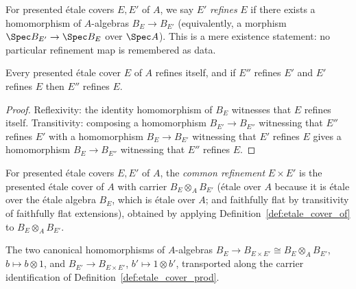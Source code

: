 \begin{definition}[Refinement]
  \label{def:etale_cover_refines}
  \leanok
  For presented \'etale covers \(E, E'\) of \(A\), we say \(E'\) \emph{refines} \(E\) if there
  exists a homomorphism of \(A\)-algebras \(B_E \to B_{E'}\) (equivalently, a morphism
  \(\Spec B_{E'} \to \Spec B_E\) over \(\Spec A\)). This is a mere existence statement: no
  particular refinement map is remembered as data.
\end{definition}

\begin{lemma}
  \label{lem:etale_cover_refines_preorder}
  \leanok
  Every presented \'etale cover \(E\) of \(A\) refines itself, and if \(E''\) refines \(E'\)
  and \(E'\) refines \(E\) then \(E''\) refines \(E\).
\end{lemma}
\begin{proof}
  \leanok
  Reflexivity: the identity homomorphism of \(B_E\) witnesses that \(E\) refines itself.
  Transitivity: composing a homomorphism \(B_{E'} \to B_{E''}\) witnessing that \(E''\) refines
  \(E'\) with a homomorphism \(B_E \to B_{E'}\) witnessing that \(E'\) refines \(E\) gives a
  homomorphism \(B_E \to B_{E''}\) witnessing that \(E''\) refines \(E\).
\end{proof}

\begin{definition}
  \label{def:etale_cover_prod}
  \leanok
  For presented \'etale covers \(E, E'\) of \(A\), the \emph{common refinement} \(E \times E'\)
  is the presented \'etale cover of \(A\) with carrier \(B_E \otimes_A B_{E'}\) (\'etale over
  \(A\) because it is \'etale over the \'etale algebra \(B_E\), which is \'etale over \(A\); and
  faithfully flat by transitivity of faithfully flat extensions), obtained by applying
  Definition~\ref{def:etale_cover_of} to \(B_E \otimes_A B_{E'}\).
\end{definition}

\begin{definition}
  \label{def:etale_cover_prod_coproj}
  \leanok
  The two canonical homomorphisms of \(A\)-algebras
  \(B_E \to B_{E \times E'} \cong B_E \otimes_A B_{E'}\), \(b \mapsto b \otimes 1\), and
  \(B_{E'} \to B_{E \times E'}\), \(b' \mapsto 1 \otimes b'\), transported along the carrier
  identification of Definition~\ref{def:etale_cover_prod}.
\end{definition}

